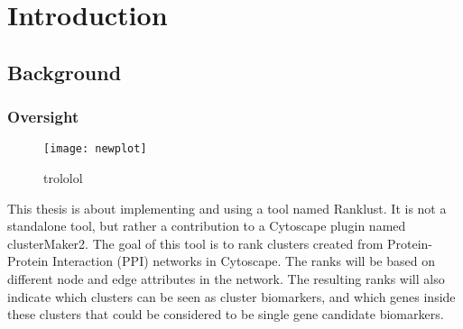 \part{Introduction}
\label{pa:intro}
\chapter{Background}
\section{Oversight}
\begin{figure}
    \label{fig:testfig}
    \hspace*{-2cm}
    \texttt{[image: newplot]}
    \caption{trololol}
\end{figure}
This thesis is about implementing and using a tool named Ranklust. It is not
a standalone tool, but rather a contribution to a Cytoscape plugin named
clusterMaker2\cite{cm2}\cite{cm2-github}. The goal of this tool is to rank
clusters created from Protein-Protein Interaction (PPI) networks in Cytoscape.
The ranks will be based on different node and edge attributes in the network.
The resulting ranks will also indicate which clusters can be seen as cluster
biomarkers, and which genes inside these clusters that could be considered to be
single gene candidate biomarkers. 

